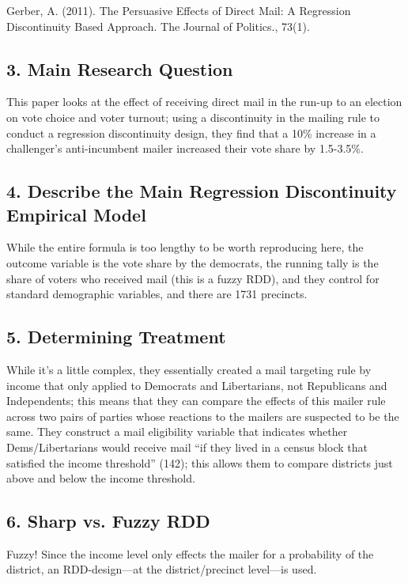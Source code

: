 \documentclass{article}
\begin{document}
Gerber, A. (2011). The Persuasive Effects of Direct Mail: A Regression Discontinuity Based Approach. The Journal of Politics., 73(1).

\subsection*{3. Main Research Question}

This paper looks at the effect of receiving direct mail in the run-up to an election on vote choice and voter turnout; using a discontinuity in the mailing rule to conduct a regression discontinuity design, they find that a 10\% increase in a challenger's anti-incumbent mailer increased their vote share by 1.5-3.5\%.

\subsection*{4. Describe the Main Regression Discontinuity Empirical Model}

While the entire formula is too lengthy to be worth reproducing here, the outcome variable is the vote share by the democrats, the running tally is the share of voters who received mail (this is a fuzzy RDD), and they control for standard demographic variables, and there are 1731 precincts. 

\subsection*{5. Determining Treatment}

While it's a little complex, they essentially created a mail targeting rule by income that only applied to Democrats and Libertarians, not Republicans and Independents; this means that they can compare the effects of this mailer rule across two pairs of parties whose reactions to the mailers are suspected to be the same. They construct a mail eligibility variable that indicates whether Dems/Libertarians would receive mail ``if they lived in a census block that satisfied the income threshold'' (142); this allows them to compare districts just above and below the income threshold.

\subsection*{6. Sharp vs. Fuzzy RDD}

Fuzzy! Since the income level only effects the mailer for a probability of the district, an RDD-design—at the district/precinct level—is used.
\end{document}
